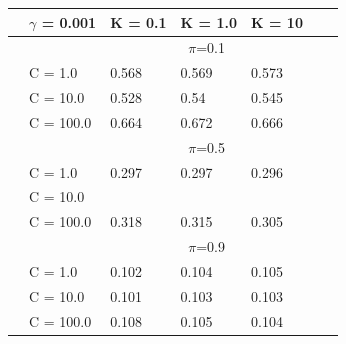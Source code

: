 \documentclass[english]{report}
\begin{document}
\begin{table}[H]
    \centering
    \begin{tabular}{ll|lllll}
        \hline
                                & \textbf{$\gamma$ = 0.001} &         K = 0.1 & K = 1.0 & K = 10 \\ \hline
                                & & \multicolumn{3}{c}{$\pi$=0.1} \\ \hline
                                & C = 1.0    & 0.568 & 0.569 & 0.573    \\
                                & C = 10.0   & 0.528 & 0.54 & 0.545  \\
                                & C = 100.0   & 0.664 & 0.672 & 0.666  \\ \hline

                                & & \multicolumn{3}{c}{$\pi$=0.5} \\ \hline
                                & C = 1.0    & 0.297 & 0.297 & 0.296    \\
                                & C = 10.0   & \color{red}{0.281} & \color{red}{0.29} & \color{red}{0.294}  \\
                                & C = 100.0   & 0.318 & 0.315 & 0.305  \\ \hline

                                & & \multicolumn{3}{c}{$\pi$=0.9} \\ \hline
                                & C = 1.0    & 0.102 & 0.104 & 0.105    \\
                                & C = 10.0   & 0.101 & 0.103 & 0.103  \\
                                & C = 100.0   & 0.108 & 0.105 & 0.104  \\ 
    \hline
    \end{tabular}
    \label{tab:RBF1_PCA8_valid}
\end{table}
\end{document}

